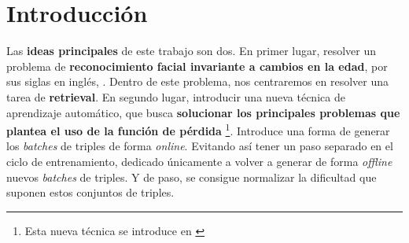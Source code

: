 
\chapter{Introducción}




Las \textbf{ideas principales} de este trabajo son dos. En primer lugar, resolver un problema de \textbf{reconocimiento facial invariante a cambios en la edad}, por sus siglas en inglés, . Dentro de este problema, nos centraremos en resolver una tarea de \textbf{retrieval}. En segundo lugar, introducir una nueva técnica de aprendizaje automático, que busca \textbf{solucionar los principales problemas que plantea el uso de la función de pérdida } \footnote{Esta nueva técnica se introduce en \cite{matematicas:principal}}. Introduce una forma de generar los \textit{batches} de triples de forma \textit{online}. Evitando así tener un paso separado en el ciclo de entrenamiento, dedicado únicamente a volver a generar de forma \textit{offline} nuevos \textit{batches} de triples. Y de paso, se consigue normalizar la dificultad que suponen estos conjuntos de triples.

